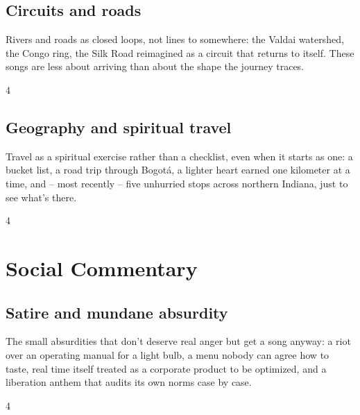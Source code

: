 \documentclass[a4paper,landscape]{memoir}
\begin{document}
\chapter{Circuits and roads}
Rivers and roads as closed loops, not lines to somewhere: the Valdai watershed, the Congo ring, the Silk Road reimagined as a circuit that returns to itself. These songs are less about arriving than about the shape the journey traces.
\clearpage\begin{multicols*}{4}
















\end{multicols*}

\chapter{Geography and spiritual travel}
Travel as a spiritual exercise rather than a checklist, even when it starts as one: a bucket list, a road trip through Bogotá, a lighter heart earned one kilometer at a time, and -- most recently -- five unhurried stops across northern Indiana, just to see what's there.
\clearpage\begin{multicols*}{4}







\end{multicols*}

\part{Social Commentary}

\chapter{Satire and mundane absurdity}
The small absurdities that don't deserve real anger but get a song anyway: a riot over an operating manual for a light bulb, a menu nobody can agree how to taste, real time itself treated as a corporate product to be optimized, and a liberation anthem that audits its own norms case by case.
\clearpage\begin{multicols*}{4}










\end{multicols*}
\end{document}
